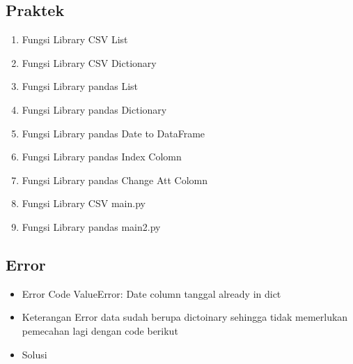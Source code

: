 \subsection{Praktek}
\begin{enumerate}
\item Fungsi Library CSV List

\item Fungsi Library CSV Dictionary

\item Fungsi Library pandas List

\item Fungsi Library pandas Dictionary

\item Fungsi Library pandas Date to DataFrame

\item Fungsi Library pandas Index Colomn

\item Fungsi Library pandas Change Att Colomn

\item Fungsi Library CSV main.py

\item Fungsi Library pandas main2.py

\end{enumerate}

\subsection{Error}
\begin{itemize}
\item Error Code
\subitem
ValueError: Date column tanggal already in dict
\item Keterangan Error
\subitem
data sudah berupa dictoinary sehingga tidak memerlukan pemecahan lagi dengan code berikut 

\item Solusi
\subitem

\end{itemize}

